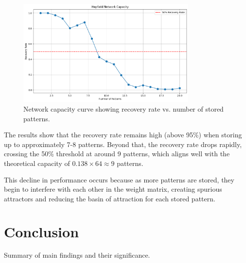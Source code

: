 \documentclass{article}
\begin{document}
\begin{figure}[H]
\centering
\includegraphics[width=0.8\textwidth]{capacity_curve.png}
\caption{Network capacity curve showing recovery rate vs. number of stored patterns.}
\label{fig:capacity}
\end{figure}

The results show that the recovery rate remains high (above 95\%) when storing up to approximately 7-8 patterns. Beyond that, the recovery rate drops rapidly, crossing the 50\% threshold at around 9 patterns, which aligns well with the theoretical capacity of $0.138 \times 64 \approx 9$ patterns.

This decline in performance occurs because as more patterns are stored, they begin to interfere with each other in the weight matrix, creating spurious attractors and reducing the basin of attraction for each stored pattern.



\section{Conclusion}

Summary of main findings and their significance.
\end{document}
